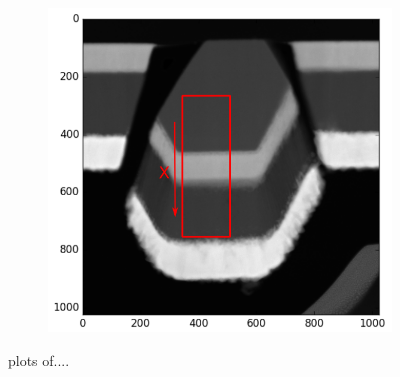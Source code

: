 \begin{figure}
\begin{subfigure}{.5\textwidth}
	\end{subfigure}%
	\begin{subfigure}{.5\textwidth}
		\centering
		\newlength\imageheight
		\includegraphics[width=.68\linewidth]{fig/q/1_overview3}
		\caption{}
		\label{fig:zeta_area1_overview}
	\end{subfigure}
	\caption{plots of....}
	\label{fig:zeta_area1}
\end{figure}

